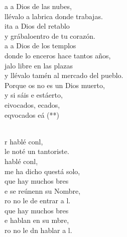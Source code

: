 \documentclass[12pt]{article}
\begin{document}
\begin{multicols*}{2}
\begin{cancion}%
	\begin{chorus}%
	a a Dios de las nubes,\\
	llévalo a labrica donde trabajas. \\
	ita a Dios del retablo\\
	y grábaloentro de tu corazón.\\
	a a Dios de los templos\\
	donde lo enceros hace tantos años,\\
	jalo libre en las plazas \\
	y llévalo tamén al mercado del pueblo.\\
\jump
	Porque os no es un Dios muerto,\\
	y si sáis e estáerto, \\
	eivocados, ecados,\\
	eqvocados eá (**)\\
	\end{chorus}%
	\jump\\
\jump
	r hablé conl,\\
	le noté un tantoriste.\\
	 hablé conl,\\
	me ha dicho questá solo,\\
	que hay muchos bres\\
	e se reúnenn su Nombre,\\
	ro no le de entrar a l.\\
	que hay muchos bres\\
	e hablan en su mbre,\\
	ro no le dn hablar a l.\\
\end{cancion}%


\end{multicols*}
\end{document}
